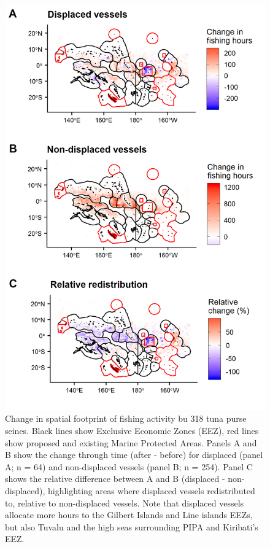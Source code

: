 \documentclass[12pt]{article}
\begin{document}
\begin{figure}
\centering
\includegraphics{img/fishing_raster_diff.png}
\caption{\label{fig:fishing_raster_diff}Change in spatial footprint of fishing activity bu 318 tuna purse seines. Black lines show Exclusive Economic Zones (EEZ), red lines show proposed and existing Marine Protected Areas. Panels A and B show the change through time (after - before) for displaced (panel A; n = 64) and non-displaced vessels (panel B; n = 254). Panel C shows the relative difference between A and B (displaced - non-displaced), highlighting areas where displaced vessels redistributed to, relative to non-displaced vessels. Note that displaced vessels allocate more hours to the Gilbert Islands and Line islands EEZs, but also Tuvalu and the high seas surrounding PIPA and Kiribati's EEZ.}
\end{figure}
\end{document}
